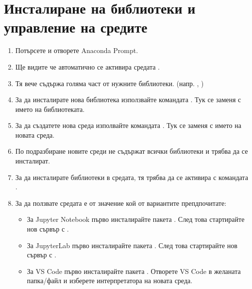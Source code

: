 \documentclass[11pt, a4paper]{article}
\begin{document}
\section{Инсталиране на библиотеки и управление на средите}

\begin{enumerate}
    \item Потърсете и отворете Anaconda Prompt.
    \item Ще видите че автоматично се активира средата .
    \item Тя вече съдържа голяма част от нужните библиотеки. (напр. , )
    \item За да инсталирате нова библиотека използвайте командата . Тук \code{[lib]} се заменя с името на библиотеката.
    \item За да създатете нова среда изполвайте командата . Тук \code{[env]} се заменя с името на новата среда.
    \item По подразбиране новите среди не съдържат всички библиотеки и трябва да се инсталират.
    \item За да инсталирате библиотеки в средата, тя трябва да се активира с командата . 
    \item За да ползвате средата е от значение кой от вариантите препдпочитате:
    \begin{itemize}
        \item За Jupyter Notebook първо инсталирайте пакета . След това стартирайте нов сървър с .
        \item За JupyterLab първо инсталирайте пакета . След това стартирайте нов сървър с .
        \item За VS Code първо инсталирайте пакета . Отворете VS Code в желаната папка/файл и изберете интерпретатора на новата среда.
    \end{itemize}
\end{enumerate}
\end{document}
